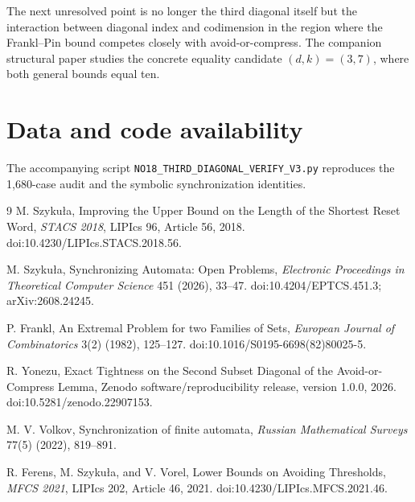 \documentclass[11pt]{article}
\theoremstyle{definition}
\theoremstyle{remark}
\begin{document}
The next unresolved point is no longer the third diagonal itself but the interaction between diagonal index and codimension in the region where the Frankl--Pin bound competes closely with avoid-or-compress. The companion structural paper studies the concrete equality candidate $(d,k)=(3,7)$, where both general bounds equal ten.

\section*{Data and code availability}
The accompanying script \texttt{NO18\_THIRD\_DIAGONAL\_VERIFY\_V3.py} reproduces the 1,680-case audit and the symbolic synchronization identities.

\begin{thebibliography}{9}
M. Szyku\l a,
\newblock Improving the Upper Bound on the Length of the Shortest Reset Word,
\newblock \emph{STACS 2018}, LIPIcs 96, Article 56, 2018.
\newblock doi:10.4230/LIPIcs.STACS.2018.56.

M. Szyku\l a,
\newblock Synchronizing Automata: Open Problems,
\newblock \emph{Electronic Proceedings in Theoretical Computer Science} 451 (2026), 33--47.
\newblock doi:10.4204/EPTCS.451.3; arXiv:2608.24245.

P. Frankl,
\newblock An Extremal Problem for two Families of Sets,
\newblock \emph{European Journal of Combinatorics} 3(2) (1982), 125--127.
\newblock doi:10.1016/S0195-6698(82)80025-5.

R. Yonezu,
\newblock Exact Tightness on the Second Subset Diagonal of the Avoid-or-Compress Lemma,
\newblock Zenodo software/reproducibility release, version 1.0.0, 2026.
\newblock doi:10.5281/zenodo.22907153.

M. V. Volkov,
\newblock Synchronization of finite automata,
\newblock \emph{Russian Mathematical Surveys} 77(5) (2022), 819--891.

R. Ferens, M. Szyku\l a, and V. Vorel,
\newblock Lower Bounds on Avoiding Thresholds,
\newblock \emph{MFCS 2021}, LIPIcs 202, Article 46, 2021.
\newblock doi:10.4230/LIPIcs.MFCS.2021.46.
\end{thebibliography}
\end{document}
